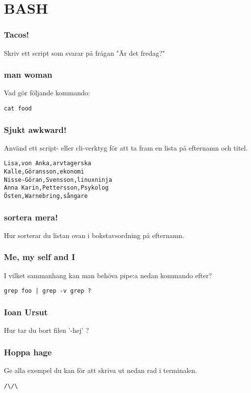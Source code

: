 \documentclass[a4paper]{report}
\begin{document}
\section{BASH}

\subsubsection{Tacos!}
Skriv ett script som svarar på frågan "Är det fredag?"

\subsubsection{man woman}
Vad gör följande kommando:
\begin{verbatim}
cat food
\end{verbatim}

\subsubsection{Sjukt awkward!}
Använd ett script- eller cli-verktyg för att ta fram en lista på efternamn och titel.
\begin{verbatim}
Lisa,von Anka,arvtagerska
Kalle,Göransson,ekonomi
Nisse-Göran,Svensson,linuxninja
Anna Karin,Pettersson,Psykolog
Östen,Warnebring,sångare
\end{verbatim}

\subsubsection{sortera mera!}
Hur sorterar du listan ovan i bokstavsordning på efternamn.

\subsubsection{Me, my self and I}
I vilket sammanhang kan man behöva pipe:a nedan kommando efter?
\begin{verbatim}
grep foo | grep -v grep ?
\end{verbatim}

\subsubsection{Ioan Ursut}
Hur tar du bort filen '-hej' ?

\subsubsection{Hoppa hage}
Ge alla exempel du kan för att skriva ut nedan rad i terminalen.
\begin{verbatim}
/\/\
\end{verbatim}
\end{document}

